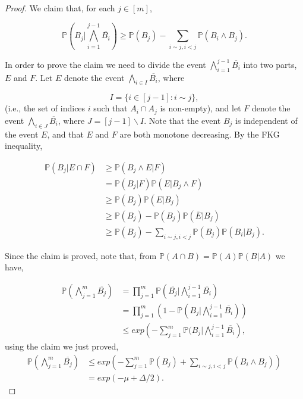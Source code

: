 \documentclass[12pt,twoside,a4paper]{book}
\numberwithin{equation}{section}
\let\backslash=\smallsetminus
\theoremstyle{remark}
\begin{document}
\begin{proof}
We claim that, for each $j \in [m]$,

$$\mathbb{P} \left( B_j | \bigwedge_{i=1}^{j-1} \overline{B_i} \right) \geq \mathbb{P}(B_j) - \sum_{i\sim j, i<j} \mathbb{P}(B_i \wedge B_j). $$

In order to prove the claim we need to divide the event $\bigwedge^{j-1}_ {i=1} \overline{B_i}$ into two parts, $E$ and $F$. Let $E$ denote the event $\bigwedge_{i \in I} \overline{B_i}$, where

$$ I = \{ i \in [j-1]: i \sim j \},$$
(i.e., the set of indices $i$ such that $A_i \cap A_j$ is non-empty), and let $F$ denote the event $\bigwedge_{i \in J} \overline{B_i}$, where $J=[j-1]\backslash I$. Note that the event $B_j$ is independent of the event $E$, and that $E$ and $F$ are both monotone decreasing. By the FKG inequality,

\begin{align*}
\mathbb{P}(B_j | E \cap F) & \geq \mathbb{P}(B_j \wedge E | F)\\
& = \mathbb{P}(B_j | F) \mathbb{P}(E | B_j \wedge F)\\
& \geq \mathbb{P}(B_j)\mathbb{P}(E|B_j)\\
& \geq \mathbb{P}(B_j) - \mathbb{P}(B_j) \mathbb{P}(\overline{E} | B_j)\\
& \geq \mathbb{P}(B_j) - \sum_{i \sim j, i < j}\mathbb{P}(B_j) \mathbb{P}(B_i | B_j).
\end{align*}

Since the claim is proved, note that, from $\mathbb{P}(A\cap B) = \mathbb{P}(A)\mathbb{P}(B|A)$ we have,

\begin{align*}
\mathbb{P}\left( \bigwedge_{j=1}^m \overline{B_j} \right) &= \prod_{j=1}^m \mathbb{P}\left( \overline{B_j} | \bigwedge_{i = 1}^{j-1} \overline{B_i}\right)\\
& = \prod_{j=1}^m \left( 1 - \mathbb{P}\left(B_j | \bigwedge_{i = 1}^{j-1} \overline{B_i}\right)\right)\\
& \leq exp\left(- \sum_{j=1}^m \mathbb{P}(B_j | \bigwedge_{i=1}^{j-1} \overline{B_i}\right),
\end{align*}
using the claim we just proved,
\begin{align*}
\mathbb{P}\left( \bigwedge_{j=1}^m \overline{B_j} \right) &\leq  exp\left(- \sum_{j=1}^m \mathbb{P}(B_j) + \sum_{i \sim j, i< j} \mathbb{P}(B_i \wedge B_j)\right)\\
& = exp( - \mu + \Delta /2).
\end{align*}


\end{proof}
\end{document}
